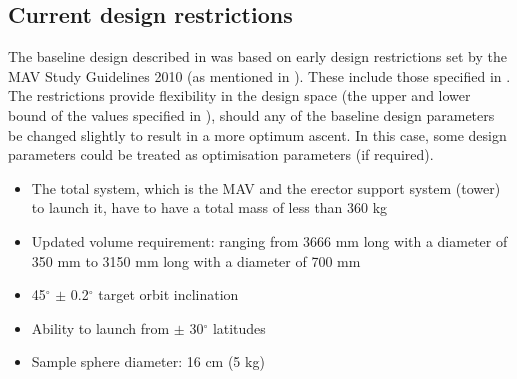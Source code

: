 \subsection{Current design restrictions}
\label{subsec:cur_des_rest}
The baseline design described in  was based on early design restrictions set by the \ac{MAV} Study Guidelines 2010 (as mentioned in \cite{trinidad2012}). These include those specified in  \cite{anderson2011propulsion}. The restrictions provide flexibility in the design space (the upper and lower bound of the values specified in ), should any of the baseline design parameters be changed slightly to result in a more optimum ascent. In this case, some design parameters could be treated as optimisation parameters (if required).


\begin{itemize}
\item The total system, which is the \ac{MAV} and the erector support system (tower) to launch it, have to have a total mass of less than 360 kg \cite{trinidad2012}
\item Updated volume requirement: ranging from 3666 mm long with a diameter of 350 mm to 3150 mm long with a diameter of 700 mm \cite{trinidad2012}
\item 45$^{\circ}$ $\pm$ 0.2$^{\circ}$ target orbit inclination \cite{anderson2011propulsion}
\item Ability to launch from $\pm$ 30$^{\circ}$ latitudes \cite{anderson2011propulsion}
\item Sample sphere diameter: 16 cm (5 kg) \cite{anderson2011propulsion}
\end{itemize}
 





